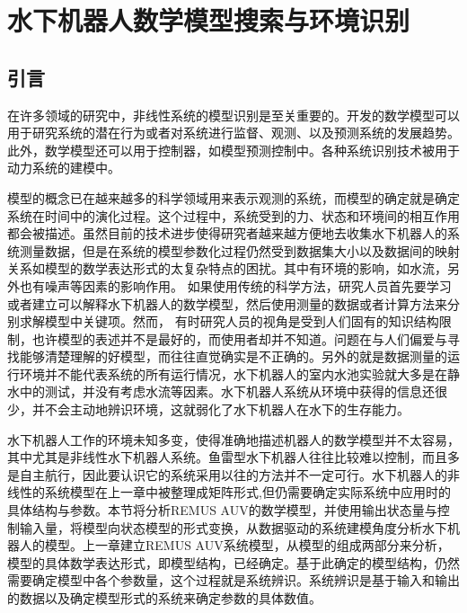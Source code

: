 
\chapter{水下机器人数学模型搜索与环境识别 }

\label{chap:system_discovery}
\section{引言}

在许多领域的研究中，非线性系统的模型识别是至关重要的\cite{kim2012estimating}。开发的数学模型可以用于研究系统的潜在行为或者对系统进行监督、观测、以及预测系统的发展趋势。此外，数学模型还可以用于控制器，如模型预测控制中。各种系统识别技术被用于动力系统的建模中。

模型的概念已在越来越多的科学领域用来表示观测的系统，而模型的确定就是确定系统在时间中的演化过程\cite{wu2016parametric}。这个过程中，系统受到的力、状态和环境间的相互作用都会被描述。虽然目前的技术进步使得研究者越来越方便地去收集水下机器人的系统测量数据，但是在系统的模型参数化过程仍然受到数据集大小以及数据间的映射关系如模型的数学表达形式的太复杂特点的困扰\cite{menezes2014symbolic,wu2016parametric}。其中有环境的影响，如水流，另外也有噪声等因素的影响作用。
如果使用传统的科学方法，研究人员首先要学习或者建立可以解释水下机器人的数学模型，然后使用测量的数据或者计算方法来分别求解模型中关键项\cite{yang2014modeling,huang2015trends}。然而，
有时研究人员的视角是受到人们固有的知识结构限制，也许模型的表述并不是最好的，而使用者却并不知道。问题在与人们偏爱与寻找能够清楚理解的好模型，而往往直觉确实是不正确的。另外的就是数据测量的运行环境并不能代表系统的所有运行情况，水下机器人的室内水池实验就大多是在静水中的测试，并没有考虑水流等因素。水下机器人系统从环境中获得的信息还很少，并不会主动地辨识环境，这就弱化了水下机器人在水下的生存能力。

水下机器人工作的环境未知多变，使得准确地描述机器人的数学模型并不太容易，其中尤其是非线性水下机器人系统。鱼雷型水下机器人往往比较难以控制，而且多是自主航行，因此要认识它的系统采用以往的方法并不一定可行。水下机器人的非线性的系统模型在上一章中被整理成矩阵形式,但仍需要确定实际系统中应用时的具体结构与参数\cite{garcia2014modelling,Tang2009Estimation,yang2014modeling}。本节将分析REMUS AUV的数学模型，并使用输出状态量与控制输入量，将模型向状态模型的形式变换，从数据驱动的系统建模角度分析水下机器人的模型\cite{brunton2016discovering,schmidt2009distilling}。上一章建立REMUS AUV系统模型，从模型的组成两部分来分析，模型的具体数学表达形式，即模型结构，已经确定。基于此确定的模型结构，仍然需要确定模型中各个参数量，这个过程就是系统辨识\cite{eng2014added}。系统辨识是基于输入和输出的数据以及确定模型形式的系统来确定参数的具体数值。

